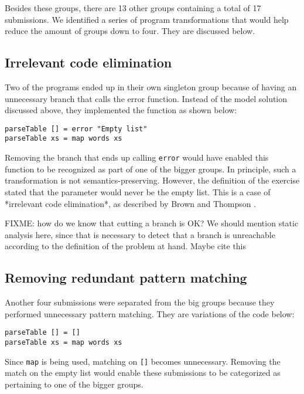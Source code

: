 Besides these groups, there are 13 other groups containing a total of 17 submissions. We identified a series of program transformations that would help reduce the amount of groups down to four. They are discussed below.

\subsection{Irrelevant code elimination}

Two of the programs ended up in their own singleton group because of having an unnecessary branch that calls the error function. Instead of the model solution discussed above, they implemented the function as shown below:

\begin{verbatim}
parseTable [] = error "Empty list"
parseTable xs = map words xs
\end{verbatim}

Removing the branch that ends up calling \texttt{error} would have enabled this function to be recognized as part of one of the bigger groups. In principle, such a transformation is not semantics-preserving. However, the definition of the exercise stated that the parameter would never be the empty list. This is a case of *irrelevant code elimination*, as described by Brown and Thompson \cite{2007brown}.

FIXME: how do we know that cutting a branch is OK? We should mention static analysis here, since that is necessary to detect that a branch is unreachable according to the definition of the problem at hand. Maybe cite this \cite{2002vaucheret}

\subsection{Removing redundant pattern matching}

Another four submissions were separated from the big groups because they performed unnecessary pattern matching. They are variations of the code below:

\begin{verbatim}
parseTable [] = []
parseTable xs = map words xs
\end{verbatim}

Since \texttt{map} is being used, matching on \texttt{[]} becomes unnecessary. Removing the match on the empty list would enable these submissions to be categorized as pertaining to one of the bigger groups.

